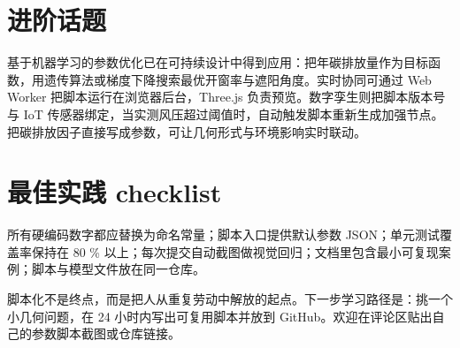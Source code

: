 \chapter{进阶话题}
基于机器学习的参数优化已在可持续设计中得到应用：把年碳排放量作为目标函数，用遗传算法或梯度下降搜索最优开窗率与遮阳角度。实时协同可通过 Web Worker 把脚本运行在浏览器后台，Three.js 负责预览。数字孪生则把脚本版本号与 IoT 传感器绑定，当实测风压超过阈值时，自动触发脚本重新生成加强节点。把碳排放因子直接写成参数，可让几何形式与环境影响实时联动。\par
\chapter{最佳实践 checklist}
所有硬编码数字都应替换为命名常量；脚本入口提供默认参数 JSON；单元测试覆盖率保持在 80 \%{} 以上；每次提交自动截图做视觉回归；文档里包含最小可复现案例；脚本与模型文件放在同一仓库。\par
脚本化不是终点，而是把人从重复劳动中解放的起点。下一步学习路径是：挑一个小几何问题，在 24 小时内写出可复用脚本并放到 GitHub。欢迎在评论区贴出自己的参数脚本截图或仓库链接。\par
